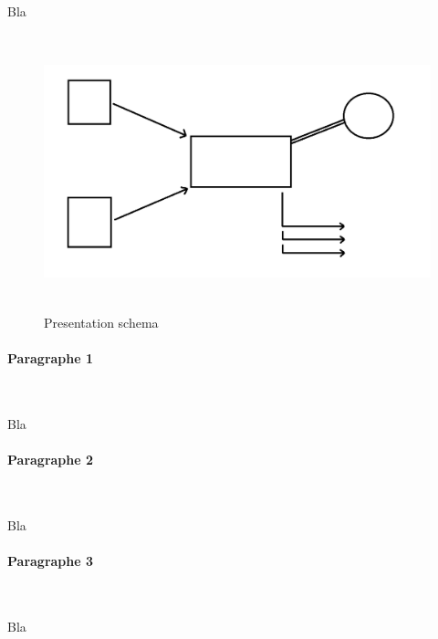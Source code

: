 Bla

\begin{figure}[!ht]
\begin{center}
\includegraphics[height=8cm]{presentation/schema}
\end{center}
\caption[schema]{Presentation schema}
\end{figure}

\paragraph*{Paragraphe 1}
~\\
\hskip7mm

Bla

\paragraph*{Paragraphe 2}
~\\
\hskip7mm

Bla

\paragraph*{Paragraphe 3}
~\\
\hskip7mm

Bla